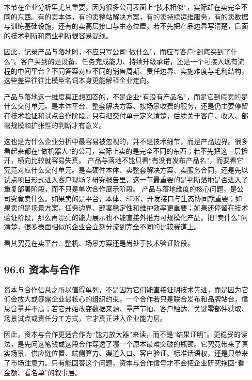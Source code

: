 本节在企业分析里尤其重要，因为很多公司表面上“技术相似”，实际却在卖完全不同的东西。有的卖本体，有的卖整站解决方案，有的卖持续运维服务，有的卖数据与训练基础设施，还有的卖高层接口与生态位置。若不先把产品边界写清楚，后面的技术判断和商业判断很容易混线。

因此，记录产品与落地时，不应只写公司“做什么”，而应写客户“到底买到了什么”。客户买到的是设备、任务完成能力、持续升级承诺，还是一个可接入现有流程的中间平台？不同答案对应不同的销售周期、责任边界、实施难度与毛利结构，这些差异往往比模型名词本身更能解释企业走向。

产品与落地这一维度真正想回答的，不是企业“有没有产品名”，而是它到底卖的是什么交付单元。是本体平台、整套解决方案、按场景收费的服务，还是仍主要停留在技术验证和试点合作阶段。只有把交付单元定义清楚，后续关于客户、收入、部署规模和扩张性的判断才有意义。

这也是为什么企业分析中最容易被忽视的，并不是技术细节，而是产品边界。很多看起来都在“做机器人”的公司，实际上卖的是完全不同的东西；若不先把这一层拆开，横向比较就容易失真。 产品与落地不能只看“有没有发布产品名”，而要看它究竟对应什么交付单元。是卖硬件本体、卖整套解决方案、卖服务合同，还是先以试点项目形式进入客户现场？研究报告里，这一节最重要的是判断落地是否进入了重复部署阶段，而不只是单次合作展示阶段。 产品与落地维度的核心问题，是公司究竟卖什么。如果卖的是平台，本体、SDK、开发接口与生态协同就重要；如果卖的是场景方案，任务边界、部署稳定性和维护效率更重要；如果还停留在技术验证阶段，那么再漂亮的能力展示也不能直接外推为可规模化产品。把“卖什么”问清楚，很多表面相似的企业会立刻分流到完全不同的比较赛道上。

看其究竟在卖平台、整机、场景方案还是尚处于技术验证阶段。

\subsection*{96.6 资本与合作}


资本与合作信息之所以值得单列，不是因为它们能直接证明技术先进，而是因为它们会放大或暴露企业最核心的组织约束。一个合作若只是联合发布和品牌站台，信息含量并不高；若它开始改变数据来源、量产节拍、客户触达、关键零部件获取、场景试点或责任分工方式，它才真正进入企业能力层。

因此，资本与合作更适合作为“能力放大器”来读，而不是“结果证明”。更稳妥的读法，是先问这笔钱或这段合作穿透了哪一个原本最难突破的瓶颈。它究竟带来了真实场景、供应链位置、端侧算力、渠道入口、客户验证、标准话语权，还是只带来了市场注意力。只有能回答这个问题，资本与合作信号才不会把企业研究拖回“看金额、看名单”的叙事层。

